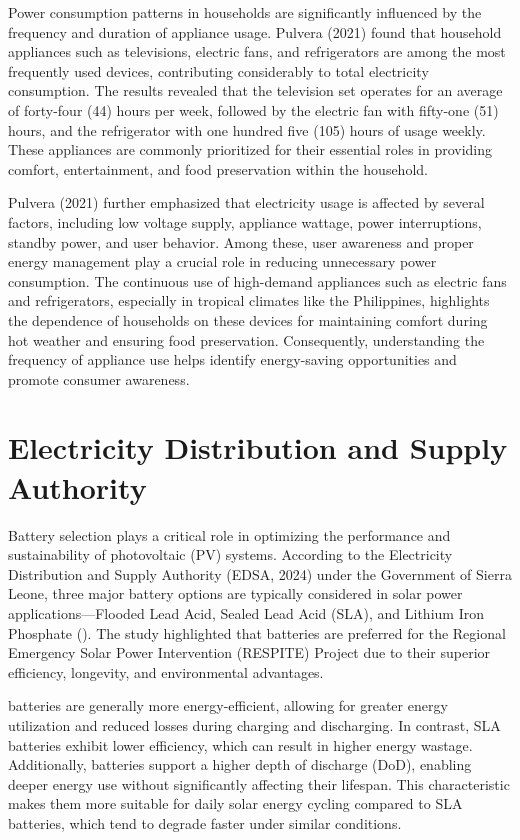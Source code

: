 {Power consumption patterns in households are significantly influenced by the frequency and duration of appliance usage. Pulvera (2021) found that household appliances such as televisions, electric fans, and refrigerators are among the most frequently used devices, contributing considerably to total electricity consumption. The results revealed that the television set operates for an average of forty-four (44) hours per week, followed by the electric fan with fifty-one (51) hours, and the refrigerator with one hundred five (105) hours of usage weekly. These appliances are commonly prioritized for their essential roles in providing comfort, entertainment, and food preservation within the household.

Pulvera (2021) further emphasized that electricity usage is affected by several factors, including low voltage supply, appliance wattage, power interruptions, standby power, and user behavior. Among these, user awareness and proper energy management play a crucial role in reducing unnecessary power consumption. The continuous use of high-demand appliances such as electric fans and refrigerators, especially in tropical climates like the Philippines, highlights the dependence of households on these devices for maintaining comfort during hot weather and ensuring food preservation. Consequently, understanding the frequency of appliance use helps identify energy-saving opportunities and promote consumer awareness.

\section{Electricity Distribution and Supply Authority}

Battery selection plays a critical role in optimizing the performance and sustainability of photovoltaic (PV) systems. According to the Electricity Distribution and Supply Authority (EDSA, 2024) under the Government of Sierra Leone, three major battery options are typically considered in solar power applications—Flooded Lead Acid, Sealed Lead Acid (SLA), and Lithium Iron Phosphate (). The study highlighted that  batteries are preferred for the Regional Emergency Solar Power Intervention (RESPITE) Project due to their superior efficiency, longevity, and environmental advantages.

 batteries are generally more energy-efficient, allowing for greater energy utilization and reduced losses during charging and discharging. In contrast, SLA batteries exhibit lower efficiency, which can result in higher energy wastage. Additionally,  batteries support a higher depth of discharge (DoD), enabling deeper energy use without significantly affecting their lifespan. This characteristic makes them more suitable for daily solar energy cycling compared to SLA batteries, which tend to degrade faster under similar conditions.

}
